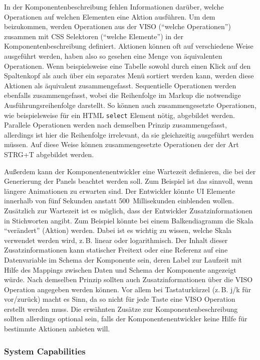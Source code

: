 \documentclass[
	headsepline,
	footsepline,
	fontsize=12pt,
	bibliography=totoc
]{scrbook}
\begin{document}
In der Komponentenbeschreibung fehlen Informationen darüber, welche Operationen auf welchen Elementen eine Aktion ausführen. Um dem beizukommen, werden Operationen aus der VISO (\enquote{welche Operationen}) zusammen mit CSS Selektoren (\enquote{welche Elemente}) in der Komponentenbeschreibung definiert. Aktionen können oft auf verschiedene Weise ausgeführt werden, haben also so gesehen eine Menge von äquivalenten Operationen. Wenn beispielsweise eine Tabelle sowohl durch einen Klick auf den Spaltenkopf als auch über ein separates Menü sortiert werden kann, werden diese Aktionen als äquivalent zusammengefasst. Sequentielle Operationen werden ebenfalls zusammengefasst, wobei die Reihenfolge im Markup die notwendige Ausführungsreihenfolge darstellt. So können auch zusammengesetzte Operationen, wie beispielsweise für ein HTML \texttt{select} Element nötig, abgebildet werden. Parallele Operationen werden nach demselben Prinzip zusammengefasst, allerdings ist hier die Reihenfolge irrelevant, da sie gleichzeitig ausgeführt werden müssen. Auf diese Weise können zusammengesetzte Operationen der der Art STRG+T abgebildet werden.

Außerdem kann der Komponentenentwickler eine Wartezeit definieren, die bei der Generierung der Panels beachtet werden soll. Zum Beispiel ist das sinnvoll, wenn längere Animationen zu erwarten sind. Der Entwickler könnte UI Elemente innerhalb von fünf Sekunden anstatt 500~Millisekunden einblenden wollen. Zusätzlich zur Wartezeit ist es möglich, dass der Entwickler Zusatzinformationen in Stichworten angibt. Zum Beispiel könnte bei einem Balkendiagramm die Skala \enquote{verändert} (Aktion) werden. Dabei ist es wichtig zu wissen, welche Skala verwendet werden wird, z.\,B. linear oder logarithmisch. Der Inhalt dieser Zusatzinformationen kann statischer Freitext oder eine Referenz auf eine Datenvariable im Schema der Komponente sein, deren Label zur Laufzeit mit Hilfe des Mappings zwischen Daten und Schema der Komponente angezeigt würde. Nach demselben Prinzip sollten auch Zusatzinformationen über die VISO Operation angegeben werden können. Vor allem bei Tastaturkürzel (z.\,B. j/k für vor/zurück) macht es Sinn, da so nicht für jede Taste eine VISO Operation erstellt werden muss. Die erwähnten Zusätze zur Komponentenbeschreibung sollten allerdings optional sein, falls der Komponentenentwickler keine Hilfe für bestimmte Aktionen anbieten will.

\subsubsection{System Capabilities}
\end{document}
